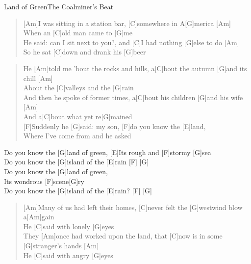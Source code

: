 \begin{song}{Land of Green}{The Coalminer's Beat}

    \begin{verse}  
        [Am]I was sitting in a station bar, [C]somewhere in A[G]merica [Am] \\
        When an [C]old man came to [G]me \\
        [Am]He said: can I sit next to you?, and [C]I had nothing [G]else to do [Am] \\
        So he sat [C]down and drank his [G]beer
    \end{verse}  

    \begin{verse}  
        He [Am]told me 'bout the rocks and hills, a[C]bout the autumn [G]and its chill [Am] \\
        About the [C]valleys and the [G]rain \\
        [Am]And then he spoke of former times, a[C]bout his children [G]and his wife [Am] \\
        And a[C]bout what yet re[G]mained \\
    
        [F]Suddenly he [G]said: my son, [F]do you know the [E]land, \\
        Where I've come from and he asked 
    \end{verse}  

    \begin{chorus}
        [Am]Do you know the [G]land of green, 
        [E]Its rough and [F]stormy [G]sea \\
        [Am]Do you know the [G]island of the [E]rain \hspace{1em} [F] \hspace{1em} [G] \\
        [Am]Do you know the [G]land of green, \\
        [E]Its wondrous [F]scene[G]ry \\
        [Am]Do you know the [G]island of the [E]rain? \hspace{1em} [F] \hspace{1em} [G]
    \end{chorus}

    \begin{verse}  
        [Am]Many of us had left their homes, [C]never felt the [G]westwind blow a[Am]gain \\
        He [C]said with lonely [G]eyes \\
        They [Am]once had worked upon the land, that [C]now is in some [G]stranger's hands [Am] \\
        He [C]said with angry [G]eyes \\


\end{verse}
\end{song}
